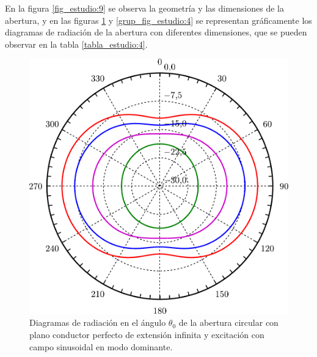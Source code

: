 En la figura \ref{fig_estudio:9} se observa la geometría y las dimensiones de la abertura, y en las figuras \ref{fig_estudio:13} y \ref{grup_fig_estudio:4} se representan gráficamente los diagramas de radiación de la abertura con diferentes dimensiones, que se pueden observar en la tabla \ref{tabla_estudio:4}.
\begin{figure}[H]
\centering
\includegraphics[scale = 0.5]{Figures/Estudio/estudio_13}
\caption{Diagramas de radiación en el ángulo $\theta_0$ de la abertura circular con plano conductor perfecto de extensión infinita y excitación con campo sinusoidal en modo dominante.}
\label{fig_estudio:13}
\end{figure}
